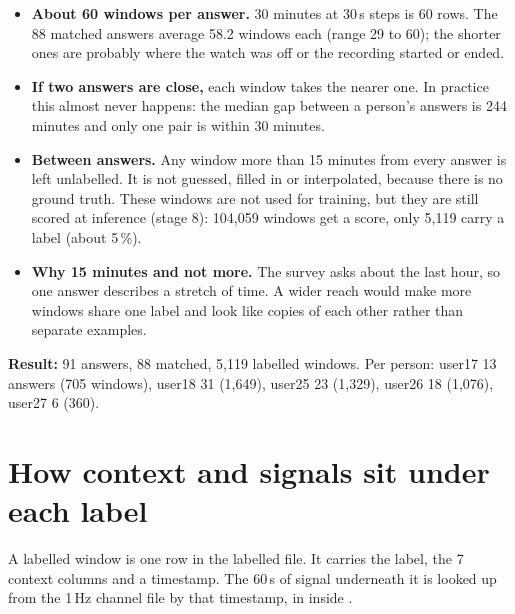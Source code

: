 \documentclass[11pt,a4paper]{article}
\newcommand{\fn}[1]{{\ttfamily\detokenize{#1}}}
\begin{document}
\begin{itemize}
\item \textbf{About 60 windows per answer.} 30 minutes at 30\,s steps is 60 rows. The 88 matched answers
average 58.2 windows each (range 29 to 60); the shorter ones are probably where the watch was off or the
recording started or ended.
\item \textbf{If two answers are close,} each window takes the nearer one. In practice this almost never
happens: the median gap between a person's answers is 244 minutes and only one pair is within 30 minutes.
\item \textbf{Between answers.} Any window more than 15 minutes from every answer is left unlabelled. It
is not guessed, filled in or interpolated, because there is no ground truth. These windows are not used
for training, but they are still scored at inference (stage 8): 104,059 windows get a score, only 5,119
carry a label (about 5\,\%).
\item \textbf{Why 15 minutes and not more.} The survey asks about the last hour, so one answer describes a
stretch of time. A wider reach would make more windows share one label and look like copies of each other
rather than separate examples.
\end{itemize}

\textbf{Result:} 91 answers, 88 matched, 5,119 labelled windows. Per person: user17 13 answers (705
windows), user18 31 (1,649), user25 23 (1,329), user26 18 (1,076), user27 6 (360).

\section{How context and signals sit under each label}
A labelled window is one row in the labelled file. It carries the label, the 7 context columns and a
timestamp. The 60\,s of signal underneath it is looked up from the 1\,Hz channel file by that timestamp,
in \fn{load_windows} inside \fn{34_train_users.py}.
\end{document}
